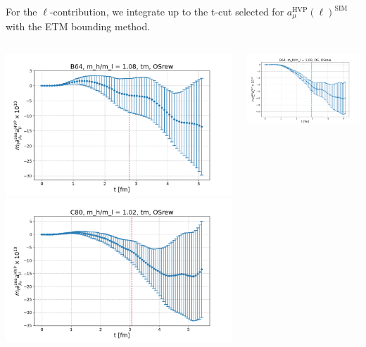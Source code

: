 \documentclass[xcolor={dvipsnames,table}]{beamer}
\begin{document}
\begin{frame}
    For the $\ell$-contribution, we integrate up to the t-cut selected for $a_\mu^\mathrm{HVP}(\ell)^\mathrm{SIM}$ with the ETM bounding method.
    \begin{columns}
    \begin{column}{0.5\textwidth}
     \includegraphics[trim=0cm 0.3cm 0cm 1.2cm, clip,width=\textwidth]{plots/der_mq_sea_lore/amu_B64_tm_der_001ml.png}
     \includegraphics[trim=0cm 0.3cm 0cm 1.2cm, clip,width=\textwidth]{plots/der_mq_sea_lore/amu_C80_tm_der_001ml.png}
    \end{column}
    \begin{column}{0.5\textwidth}
     \includegraphics[trim=0cm 0.3cm 0cm 1.2cm, clip,width=\textwidth]{plots/der_mq_sea_lore/amu_B64_OS_der_001ml.png}

\end{column}
\end{columns}
\end{frame}
\end{document}
